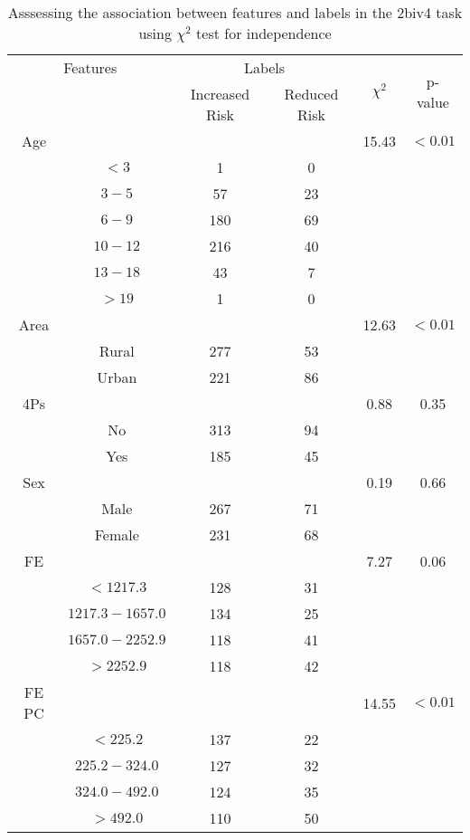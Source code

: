 \begin{table}[!htb]
\centering
\caption{Asssessing the association between features and labels in the 2biv4 task using $\chi^2$ test for independence}
\label{tab:chitest_2biv4}
\begin{tabular}{c c | c c| c | c}
\hline
\multicolumn{2}{c|}{Features}& \multicolumn{2}{c|}{Labels}& \multirow{2}{*}{$\chi^2$} & \multirow{2}{*}{p-value}\\ 
& & Increased Risk & Reduced Risk & & \\ 
\hline
Age &  &  & & 15.43 & $< 0.01$ \\ 
& $< 3$ & 1 & 0& & \\ 
& $3-5$ & 57 & 23& & \\ 
& $6-9$ & 180 & 69& & \\ 
& $10-12$ & 216 & 40& & \\ 
& $13-18$ & 43 & 7& & \\ 
& $> 19$ & 1 & 0& & \\ 
\hline 
Area &  &  & & 12.63 & $< 0.01$ \\ 
& Rural & 277 & 53& & \\ 
& Urban & 221 & 86& & \\ 
\hline 
4Ps &  &  & & 0.88 & 0.35 \\ 
& No & 313 & 94& & \\ 
& Yes & 185 & 45& & \\ 
\hline 
Sex &  &  & & 0.19 & 0.66 \\ 
& Male & 267 & 71& & \\ 
& Female & 231 & 68& & \\ 
\hline 
FE &  &  & & 7.27 & 0.06 \\ 
& $< 1217.3$ & 128 & 31& & \\ 
& $1217.3-1657.0$ & 134 & 25& & \\ 
& $1657.0-2252.9$ & 118 & 41& & \\ 
& $> 2252.9$ & 118 & 42& & \\ 
\hline 
FE PC &  &  & & 14.55 & $< 0.01$ \\ 
& $< 225.2$ & 137 & 22& & \\ 
& $225.2-324.0$ & 127 & 32& & \\ 
& $324.0-492.0$ & 124 & 35& & \\ 
& $> 492.0$ & 110 & 50& & \\ 
\hline 
\end{tabular}
\end{table}
